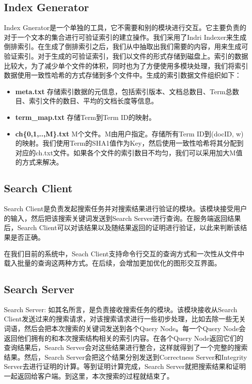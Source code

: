 \subsection{Index Generator}
Index Gnerator是一个单独的工具，它不需要和别的模块进行交互。它主要负责的对于一个文本的集合进行可验证索引的建立操作。我们采用了Indri Indexer\cite{Indri}来生成倒排索引。在生成了倒排索引之后，我们从中抽取出我们需要的内容，用来生成可验证索引。对于生成的可验证索引，我们以文件的形式存储到磁盘上。索引的数据比较大，为了减少单个文件的体积，同时也为了方便使用多模块处理，我们将索引数据使用一致性哈希的方式存储到多个文件中。生成的索引数据文件组织如下：
\begin{itemize}
\item \textbf{meta.txt} 存储索引数据的元信息，包括索引版本、文档总数目、Term总数目、索引文件的数目、平均的文档长度等信息。
\item \textbf{term\_map.txt} 存储Term到Term ID的映射。
\item \textbf{ch\{0,1,..,M\}.txt} M个文件。M由用户指定。存储所有Term ID到(docID, w)的映射。我们使用Term的SHA1值作为Key，然后使用一致性哈希将其分配到对应的ch.txt文件。如果各个文件的索引数目不均匀，我们可以采用加大M值的方式来解决。
\end{itemize}

\subsection{Search Client}
Search Client是负责发起搜索任务并对搜索结果进行验证的模块。该模块接受用户的输入，然后把该搜索关键词发送到Search Server进行查询。在服务端返回结果后，Search Client可以对该结果以及随结果返回的证明进行验证，以此来判断该结果是否正确。

在我们目前的系统中，Seach Client支持命令行交互的查询方式和一次性从文件中载入批量的查询这两种方式。在后续，会增加更加优化的图形交互界面。

\subsection{Search Server}
Search Server: 如其名所言，是负责接收搜索任务的模块。该模块接收从Search Client发送过来的搜索请求，对该搜索请求进行一些初步处理，比如去除一些无关词语，然后会把本次搜索的关键词发送到各个Query Node。每一个Query Node会返回他们拥有的和本次搜索结构相关的索引内容。在各个Query Node返回它们的查询结果后，Search Server会对这些结果进行整合，这样就得到了一个完整的搜索结果。然后，Search Server会把这个结果分别发送到Correctness Server和Integrity Server去进行证明的计算。等到证明计算完成，Search Server就把搜索结果和证明一起返回给客户端。到这里，本次搜索的过程就结束了。

